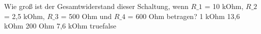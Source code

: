     {Wie groß ist der Gesamtwiderstand dieser Schaltung, wenn $R\_1$ = 10 kOhm, $R\_2$ = 2,5 kOhm, $R\_3$ = 500 Ohm und $R\_4$ = 600 Ohm betragen? }
    {1 kOhm}
    {13,6 kOhm}
    {200 Ohm}
    {7,6 kOhm}
    {true}{false}
